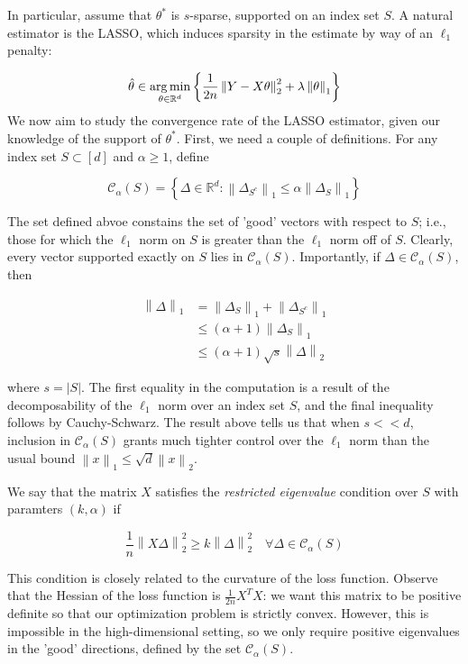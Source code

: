 \documentclass{article}
\newcommand{\R}{\mathbb{R}}
\newcommand{\cC}{\mathcal{C}}
\newcommand{\argmin}{\mathop{\rm arg\,min}}
\newcommand{\norm}[1]{\left\|#1\right\|}
\begin{document}
In particular, assume that $\theta^{*}$ is $s$-sparse, supported on an index set $S$. A natural estimator is the LASSO, which induces sparsity in the estimate by way of an $\ell_{1}$ penalty:

$$\hat{\theta} \in \argmin_{\theta \in \R^{d}}\left\{\frac{1}{2n}\norm{Y - X\theta}^{2}_{2} + \lambda \norm{\theta}_{1}\right\}$$
We now aim to study the convergence rate of the LASSO estimator, given our knowledge of the support of $\theta^{*}$. First, we need a couple of definitions. For any index set $S \subset [d]$ and $\alpha \geq 1$, define

$$\cC_{\alpha}(S) = \left\{ \Delta \in \R^{d} : \norm{\Delta_{S^{c}}}_{1} \leq \alpha \norm{\Delta_{S}}_{1}\right\}$$

The set defined abvoe constains the set of 'good' vectors with respect to $S$; i.e., those for which the $\ell_{1}$ norm on $S$ is greater than the $\ell_{1}$ norm off of $S$. Clearly, every vector supported exactly on $S$ lies in $\cC_{\alpha}(S)$. Importantly, if $\Delta \in \cC_{\alpha}(S)$, then

\begin{align*}
  \norm{\Delta}_{1}
  &= \norm{\Delta_{S}}_{1} + \norm{\Delta_{S^{c}}}_{1} \\
  &\leq (\alpha + 1)\norm{\Delta_{S}}_{1} \\
  &\leq (\alpha + 1)\sqrt{s}\norm{\Delta}_{2}
\end{align*}

where $s = |S|$. The first equality in the computation is a result of the decomposability of the $\ell_{1}$ norm over an index set $S$, and the final inequality follows by Cauchy-Schwarz.  The result above tells us that when $s << d$, inclusion in $\cC_{\alpha}(S)$ grants much tighter control over the $\ell_{1}$ norm than the usual bound $\norm{x}_{1} \leq \sqrt{d}\norm{x}_{2}$.

We say that the matrix $X$ satisfies the \textit{restricted eigenvalue} condition over $S$ with paramters $(k, \alpha)$ if

$$\frac1n\norm{X\Delta}_{2}^{2} \geq k\norm{\Delta}_{2}^{2} \quad \forall \Delta \in \cC_{\alpha}(S)$$

This condition is closely related to the curvature of the loss function. Observe that the Hessian of the loss function is $\frac{1}{2n} X^{T}X$: we want this matrix to be positive definite so that our optimization problem is strictly convex. However, this is impossible in the high-dimensional setting, so we only require positive eigenvalues in the 'good' directions, defined by the set $\cC_{\alpha}(S)$.
\end{document}
